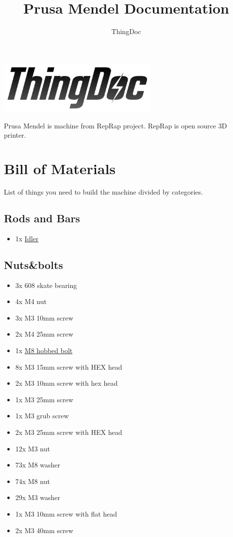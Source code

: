 \documentclass[11pt]{article}
\title{Prusa Mendel Documentation}
\author{ThingDoc}
\begin{document}
\maketitle
\begin{center}
\includegraphics[width=8cm]{logo.png}
\end{center}
Prusa Mendel is machine from RepRap project. RepRap is open source 3D printer.

\newpage

\tableofcontents

\newpage

\section{Bill of Materials}
List of things you need to build the machine divided by categories.

\subsection{Rods and Bars}
\begin{itemize}
\item 1x \hyperlink{thing_idler-m8-piece}{Idler}
\end{itemize}

\subsection{Nuts\&bolts}
\begin{itemize}
\item 3x 608 skate bearing
\item 4x M4 nut
\item 3x M3 10mm screw
\item 2x M4 25mm screw
\item 1x \hyperlink{thing_hobbed-bolt}{M8 hobbed bolt}
\item 8x M3 15mm screw with HEX head
\item 2x M3 10mm screw with hex head
\item 1x M3 25mm screw
\item 1x M3 grub screw
\item 2x M3 25mm screw with HEX head
\item 12x M3 nut
\item 73x M8 washer
\item 74x M8 nut
\item 29x M3 washer
\item 1x M3 10mm screw with flat head
\item 2x M3 40mm screw
\end{itemize}
\end{document}
